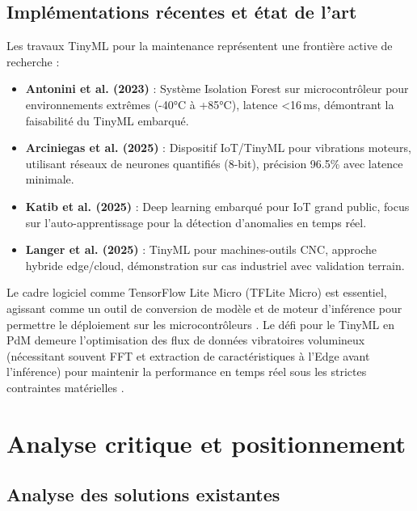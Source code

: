 \subsection{Implémentations récentes et état de l'art}

Les travaux TinyML pour la maintenance représentent une frontière active de recherche :

\begin{itemize}
\item \textbf{Antonini et al. (2023)} \cite{antonini2023} : Système Isolation Forest sur microcontrôleur pour environnements extrêmes (-40°C à +85°C), latence <16\,ms, démontrant la faisabilité du TinyML embarqué.

\item \textbf{Arciniegas et al. (2025)} \cite{arciniegas2025} : Dispositif IoT/TinyML pour vibrations moteurs, utilisant réseaux de neurones quantifiés (8-bit), précision 96.5\% avec latence minimale.

\item \textbf{Katib et al. (2025)} \cite{katib2025} : Deep learning embarqué pour IoT grand public, focus sur l'auto-apprentissage pour la détection d'anomalies en temps réel.

\item \textbf{Langer et al. (2025)} \cite{langer2025} : TinyML pour machines-outils CNC, approche hybride edge/cloud, démonstration sur cas industriel avec validation terrain.
\end{itemize}

Le cadre logiciel comme TensorFlow Lite Micro (TFLite Micro) est essentiel, agissant comme un outil de conversion de modèle et de moteur d'inférence pour permettre le déploiement sur les microcontrôleurs \cite{tflitemicro,tsoukas2024}. Le défi pour le TinyML en PdM demeure l'optimisation des flux de données vibratoires volumineux (nécessitant souvent FFT et extraction de caractéristiques à l'Edge avant l'inférence) pour maintenir la performance en temps réel sous les strictes contraintes matérielles \cite{gupta2025}.

\section{Analyse critique et positionnement}

\subsection{Analyse des solutions existantes}


